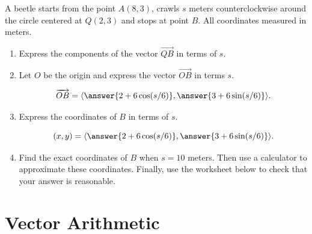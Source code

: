 \documentclass{ximera}
\begin{document}
\begin{question}  \label{QDfg554egsE}
A beetle starts from the point $A(8,3)$, crawls $s$ meters counterclockwise around the circle centered at $Q(2,3)$ and stops at point $B$. All coordinates measured in meters.

\begin{enumerate}
\item Express the components of the vector $\overrightarrow{QB}$ in terms of $s$.

\item Let $O$ be the origin and express the vector $\overrightarrow{OB}$ in terms $s$.

\[
     \overrightarrow{OB}= \langle \answer{2 + 6 \cos(s/6)}  ,  \answer{3 + 6\sin(s/6)} \rangle  .
\]

\item Express the coordinates of $B$ in terms of $s$.

\[
   (x,y) = \langle \answer{2 + 6 \cos(s/6)}  ,  \answer{3 + 6\sin(s/6)} \rangle  .
\]

\item Find the exact coordinates of $B$ when $s=10$ meters. Then use a calculator to approximate these coordinates. Finally, use the worksheet below to check that your answer is reasonable.
\end{enumerate}
\end{question}



\section{Vector Arithmetic}
\end{document}
